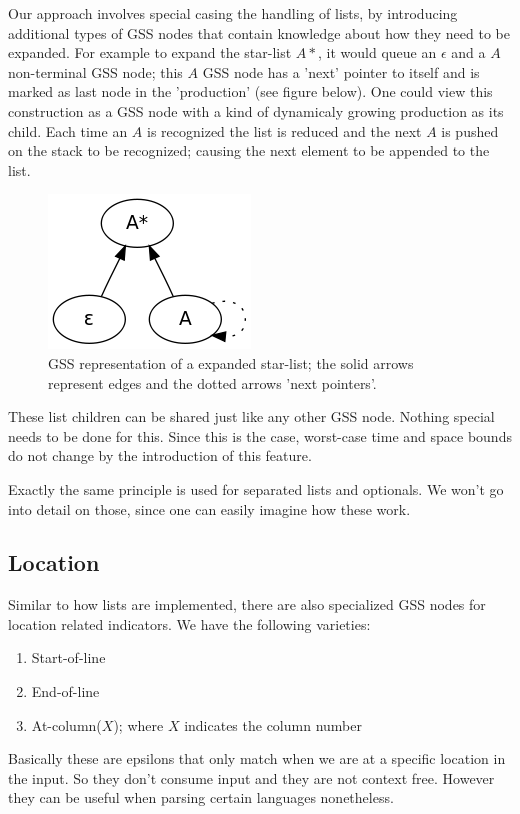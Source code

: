\documentclass[a4paper,10pt]{article}
\begin{document}
Our approach involves special casing the handling of lists, by introducing additional types of GSS nodes that contain knowledge about how they need to be expanded. For example to expand the star-list $A*$, it would queue an $\epsilon$ and a $A$ non-terminal GSS node; this $A$ GSS node has a 'next' pointer to itself and is marked as last node in the 'production' (see figure below). One could view this construction as a GSS node with a kind of dynamicaly growing production as its child. Each time an $A$ is recognized the list is reduced and the next $A$ is pushed on the stack to be recognized; causing the next element to be appended to the list.

\begin{figure}[H]
\centering
\includegraphics[scale=0.5]{star-list.png}
\caption{GSS representation of a expanded star-list; the solid arrows represent edges and the dotted arrows 'next pointers'.}
\end{figure}

These list children can be shared just like any other GSS node. Nothing special needs to be done for this. Since this is the case, worst-case time and space bounds do not change by the introduction of this feature.

Exactly the same principle is used for separated lists and optionals. We won't go into detail on those, since one can easily imagine how these work.

\subsection{Location}

Similar to how lists are implemented, there are also specialized GSS nodes for location related indicators. We have the following varieties:
\begin{enumerate}
 \setlength{\itemsep}{0pt}
 \setlength{\parskip}{0pt}
 \setlength{\parsep}{0pt}
 
 \item Start-of-line
 \item End-of-line
 \item At-column($X$); where $X$ indicates the column number
\end{enumerate}
Basically these are epsilons that only match when we are at a specific location in the input. So they don't consume input and they are not context free. However they can be useful when parsing certain languages nonetheless.
\end{document}
